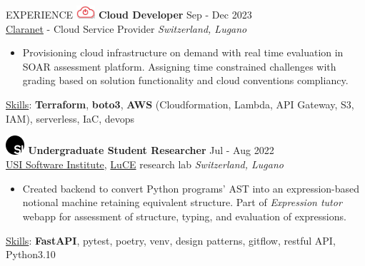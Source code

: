 \documentclass{cv} %
\def\intraexpvspace{0.15cm}
\def\titlelistvspace{-0.15cm}
\begin{document}
\begin{rSection}{EXPERIENCE}
    \includegraphics[width=0.7cm, trim={0cm 15cm 0cm 0cm}]{claranet-logo.png}
    \textbf{Cloud Developer} \hfill Sep - Dec 2023\\
    \hspace*{0.85cm}\href{https://www.claranet.com/}{Claranet} - Cloud Service Provider
    \hfill \textit{Switzerland, Lugano}
    \vspace{\titlelistvspace}\begin{itemize}
        \itemsep -3pt {}
        \item Provisioning cloud infrastructure on demand
              with real time evaluation in SOAR assessment platform.
              Assigning time constrained challenges with grading based on solution functionality
              and cloud conventions compliancy.
    \end{itemize}
    \vspace*{-0.1cm}\hspace*{0.5cm}\underline{Skills}: \textbf{Terraform},
    \textbf{boto3},
    \textbf{AWS} (Cloudformation, Lambda, API Gateway, S3, IAM), %
    serverless,
    IaC,
    devops
    \vspace{\intraexpvspace}

    \includegraphics[width=0.7cm, trim={0cm 10cm 0cm 0cm}]{si-icon.jpg}
    \hspace*{0cm}\textbf{Undergraduate Student Researcher} \hfill Jul - Aug 2022\\
    \hspace*{0.85cm}\href{https://www.si.usi.ch/}{USI Software Institute},
    \href{https://luce.si.usi.ch/team/}{LuCE} research lab
    \hfill \textit{Switzerland, Lugano}
    \vspace{\titlelistvspace}\begin{itemize}
        \itemsep -3pt {}
        \item Created backend to convert Python programs' AST
              into an expression-based notional machine retaining equivalent structure.
              Part of \textit{Expression tutor} webapp for assessment of structure, typing, and evaluation of expressions.
    \end{itemize}
    \vspace*{-0.1cm}\hspace*{0.5cm}\underline{Skills}: \textbf{FastAPI}, pytest, poetry, venv, design patterns, gitflow, restful API, Python3.10
    \vspace{\intraexpvspace}


\end{rSection}
\end{document}
